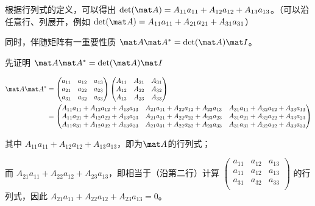 根据行列式的定义，可以得出 $\det(\mat A) = A_{11}a_{11}+A_{12}a_{12}+A_{13}a_{13}$。（可以沿任意行、列展开，例如 $\det(\mat A) = A_{11}a_{11}+A_{21}a_{21}+A_{31}a_{31}$）

同时，伴随矩阵有一重要性质 $\mat A \mat A^* = \det(\mat A)\mat I$。

先证明 $\mat A \mat A^* = \det(\mat A)\mat I$

\begin{equation}
\begin{aligned}
\mat A \mat A^* &=
\begin{pmatrix}
a_{11}&a_{12}&a_{13}\\
a_{21}&a_{22}&a_{23}\\
a_{31}&a_{32}&a_{33}\\
\end{pmatrix}
\begin{pmatrix}
A_{11}&A_{21}&A_{31}\\
A_{12}&A_{22}&A_{32}\\
A_{13}&A_{23}&A_{33}\\
\end{pmatrix}\\
&=
\begin{pmatrix}
A_{11}a_{11}+A_{12}a_{12}+A_{13}a_{13}&A_{21}a_{11}+A_{22}a_{12}+A_{23}a_{13}&A_{31}a_{11}+A_{32}a_{12}+A_{33}a_{13}\\
A_{11}a_{21}+A_{12}a_{22}+A_{13}a_{23}&A_{21}a_{21}+A_{22}a_{22}+A_{23}a_{23}&A_{31}a_{21}+A_{32}a_{22}+A_{33}a_{23}\\
A_{11}a_{31}+A_{12}a_{32}+A_{13}a_{33}&A_{21}a_{31}+A_{22}a_{32}+A_{23}a_{33}&A_{31}a_{31}+A_{32}a_{32}+A_{33}a_{33}\\
\end{pmatrix}
\end{aligned}
\end{equation}

其中
$A_{11}a_{11}+A_{12}a_{12}+A_{13}a_{13}$，即为$\mat A$的行列式；

而
$A_{21}a_{11}+A_{22}a_{12}+A_{23}a_{13}$，即相当于（沿第二行）计算
$\begin{pmatrix}
a_{11}&a_{12}&a_{13}\\
a_{11}&a_{12}&a_{13}\\
a_{31}&a_{32}&a_{33}\\
\end{pmatrix}$
的行列式，因此 $A_{21}a_{11}+A_{22}a_{12}+A_{23}a_{13}=0$。

